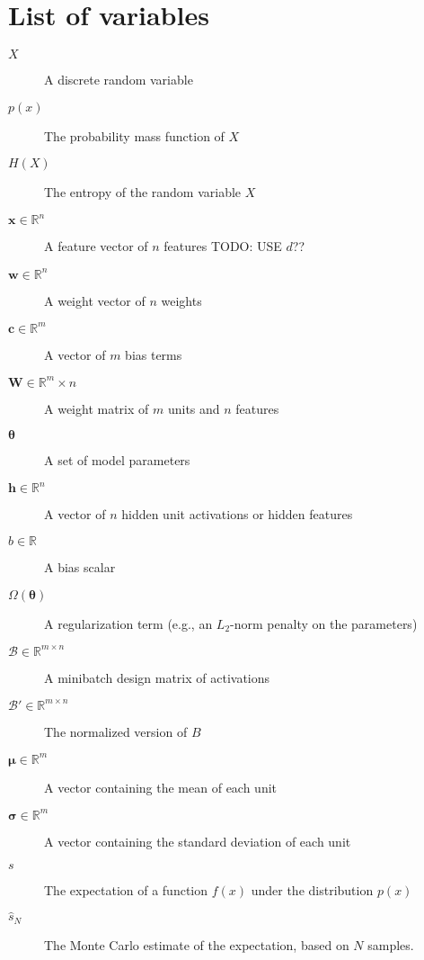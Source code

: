 \chapter*{List of variables}

\begin{description}
    \item[$X$] A discrete random variable
    \item[$p(x)$] The probability mass function of $X$
    \item[$H(X)$] The entropy of the random variable $X$
    \item[$\mathbf{x} \in \mathbb{R}^n$] A feature vector of $n$ features TODO: USE $d$??
    \item[$\mathbf{w} \in \mathbb{R}^n$] A weight vector of $n$ weights
    \item[$\mathbf{c} \in \mathbb{R}^m$] A vector of $m$ bias terms
    \item[$\mathbf{W} \in \mathbb{R}^m\times n$] A weight matrix of $m$ units and $n$ features
    \item[$\boldsymbol{\theta}$] A set of model parameters
    \item[$\mathbf{h} \in \mathbb{R}^n$] A vector of $n$ hidden unit activations or hidden features
    \item[$b \in \mathbb{R}$] A bias scalar 
    \item[$\Omega(\boldsymbol{\theta})$] A regularization term (e.g., an $L_2$-norm penalty on the parameters)
    \item[$\mathcal{B} \in \mathbb{R}^{m\times n}$] A minibatch design matrix of activations
    \item[$\mathcal{B}' \in \mathbb{R}^{m\times n}$] The normalized version of $B$
    \item[$\boldsymbol{\mu} \in \mathbb{R}^m$] A vector containing the mean of each unit
    \item[$\boldsymbol{\sigma} \in \mathbb{R}^m$] A vector containing the standard deviation of each unit
    
    \item[$s$] The expectation of a function $f(x)$ under the distribution $p(x)$
    \item[$\hat{s}_N$] The Monte Carlo estimate of the expectation, based on $N$ samples.
  \end{description}